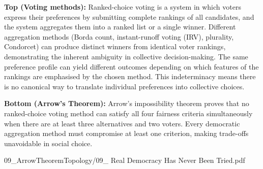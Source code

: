 \begin{SideNotePage}{
  \textbf{Top (Voting methods):} Ranked-choice voting is a system in which voters express their preferences by submitting complete rankings of all candidates, and the system aggregates them into a ranked list or a single winner. Different aggregation methods (Borda count, instant-runoff voting (IRV), plurality, Condorcet) can produce distinct winners from identical voter rankings, demonstrating the inherent ambiguity in collective decision-making. The same preference profile can yield different outcomes depending on which features of the rankings are emphasised by the chosen method. This indeterminacy means there is no canonical way to translate individual preferences into collective choices. \par

  \textbf{Bottom (Arrow's Theorem):} Arrow's impossibility theorem proves that no ranked-choice voting method can satisfy all four fairness criteria simultaneously when there are at least three alternatives and two voters. Every democratic aggregation method must compromise at least one criterion, making trade-offs unavoidable in social choice. \par
}{09_ArrowTheoremTopology/09_ Real Democracy Has Never Been Tried.pdf}
\end{SideNotePage}
